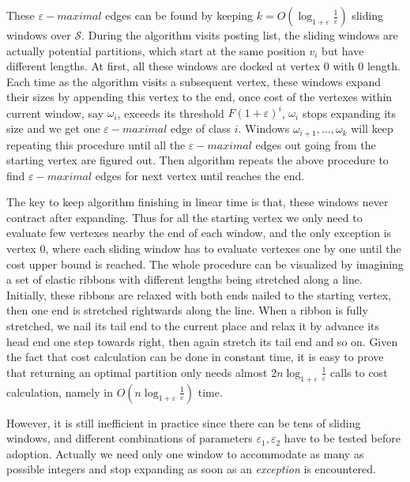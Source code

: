 \documentclass[runningheads,a4paper]{llncs}
\begin{document}
These $\varepsilon-maximal$ edges can be found by keeping $k = O\left(\log_{1+\varepsilon}\frac{1}{\varepsilon}\right)$ sliding windows over $\mathcal{S}$.
During the algorithm visits posting list, the sliding windows are actually potential partitions, which start at the same position $ v_{i} $ but have different lengths.
At first, all these windows are docked at vertex 0 with 0 length.
Each time as the algorithm visits a subsequent vertex, these windows expand their sizes by appending this vertex to the end, once cost of the vertexes within current window, say $ \omega_{i} $, exceeds its threshold $ F \left( 1 + \varepsilon \right) ^{i} $, $ \omega_{i} $ stops expanding its size and we get one $\varepsilon-maximal$ edge of class $ i $.
Windows $ \omega_{i+1}, \dots, \omega_{k}$ will keep repeating this procedure until all the $\varepsilon-maximal$ edges out going from the starting vertex are figured out.
Then algorithm repeats the above procedure to find $\varepsilon-maximal$ edges for next vertex until reaches the end.

The key to keep algorithm finishing in linear time is that, these windows never contract after expanding.
Thus for all the starting vertex we only need to evaluate few vertexes nearby the end of each window, and the only exception is vertex 0, where each sliding window has to evaluate vertexes one by one until the cost upper bound is reached.
The whole procedure can be visualized by imagining a set of elastic ribbons with different lengths being stretched along a line.
Initially, these ribbons are relaxed with both ends nailed to the starting vertex, then one end is stretched rightwards along the line.
When a ribbon is fully stretched, we nail its tail end to the current place and relax it by advance its head end one step towards right, then again stretch its tail end and so on. Given the fact that cost calculation can be done in constant time, it is easy to prove that returning an optimal partition only needs almost $ 2n\log_{1+\varepsilon}\frac{1}{\varepsilon} $ calls to cost calculation, namely in $O\left(n\log_{1+\varepsilon}\frac{1}{\varepsilon}\right)$ time.

However, it is still inefficient in practice since there can be tens of sliding windows, and different combinations of parameters $ \varepsilon_1,\varepsilon_2 $ have to be tested before adoption.
Actually we need only one window to accommodate as many as possible integers and stop expanding as soon as an \textit{exception} is encountered.
\end{document}
